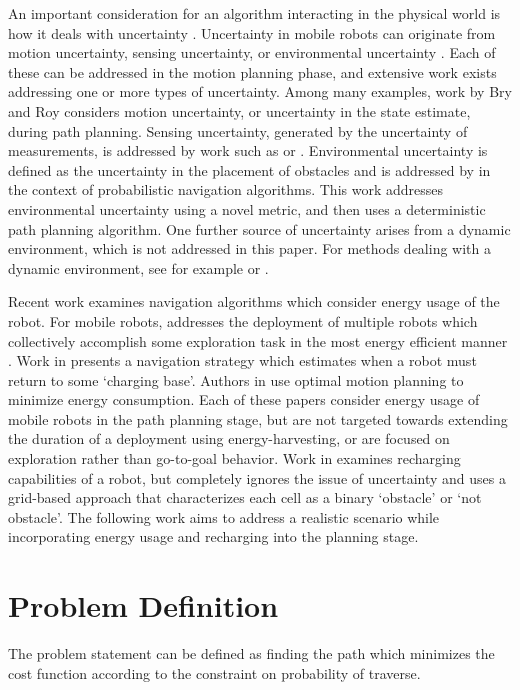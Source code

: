 \documentclass[journal]{IEEEtran}
\newcounter{col}
\begin{document}
An important consideration for an algorithm interacting in the physical world is how it deals with uncertainty \cite{thrun2005probabilistic}. 
Uncertainty in mobile robots can originate from motion uncertainty, sensing uncertainty, or environmental uncertainty \cite{van2011lqg}. 
Each of these can be addressed in the motion planning phase, and extensive work exists addressing one or more types of uncertainty. 
Among many examples, work by Bry and Roy \cite{bry2011rapidly} considers motion uncertainty, or uncertainty in the state estimate, during path planning. 
Sensing uncertainty, generated by the uncertainty of measurements, is addressed by work such as  \cite{luders2010bounds} or \cite{van2011lqg}. 
Environmental uncertainty is defined as the uncertainty in the placement of obstacles and is addressed by \cite{lee2008cost, tahirovic2011roughness, melchior2007particle} in the context of probabilistic navigation algorithms. 
This work addresses environmental uncertainty using a novel metric, and then uses a deterministic path planning algorithm. 
One further source of uncertainty arises from a dynamic environment, which is not addressed in this paper. 
For methods dealing with a dynamic environment, see for example \cite{(Frazzoli- Motion Planning with Moving Obstacles)} or \cite{(Likhachev and Koenig - Fast Replanning for navigation in unknown environment)}.

Recent work examines navigation algorithms which consider energy usage of the robot. 
For mobile robots, \cite{mei2006deployment} addresses the deployment of multiple robots which collectively accomplish some exploration task in the most energy efficient manner \cite{mei2006energy}. 
Work in \cite{wang2008staying} presents a navigation strategy which estimates when a robot must return to some ‘charging base’.
Authors in \cite{liu2014minimizing} use optimal motion planning to minimize energy consumption. 
Each of these papers consider energy usage of mobile robots in the path planning stage, but are not targeted towards extending the duration of a deployment using energy-harvesting, or are focused on exploration rather than go-to-goal behavior. 
Work in \cite{mills2008continuous} examines recharging capabilities of a robot, but completely ignores the issue of uncertainty and uses a grid-based approach that characterizes each cell as a binary ‘obstacle’ or ‘not obstacle’.
The following work aims to address a realistic scenario while incorporating energy usage and recharging into the planning stage.


\section{Problem Definition}
The problem statement can be defined as finding the path which minimizes the cost function according to the constraint on probability of traverse.
\end{document}
